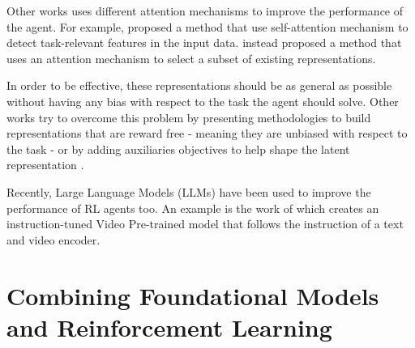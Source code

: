 Other works uses different attention mechanisms to improve the performance of the agent.
For example, \citet{bramlage2022generalized} proposed a method that use self-attention mechanism to detect task-relevant features in the input data.
\citet{blakeman2022selective} instead proposed a method that uses an attention mechanism to select a subset of existing representations.

In order to be effective, these representations should be as general as possible without having any bias with respect to the task the agent should solve.
Other works try to overcome this problem by presenting methodologies to build representations that are reward free - meaning they are unbiased with respect to the task \citep{stooke2021decoupling} - or by adding auxiliaries objectives to help shape the latent representation \citep{lan2023bootstrapped}.

Recently, Large Language Models (LLMs) have been used to improve the performance of RL agents too.
An example is the work of \citet{lifshitz2024steve} which creates an instruction-tuned Video Pre-trained model that follows the instruction of a text and video encoder.





\section{Combining Foundational Models and Reinforcement Learning}\label{sec:fm_rl_combination}




